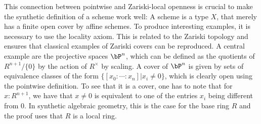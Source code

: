 This connection between pointwise and Zariski-local openness is crucial to make the synthetic definition of a scheme work well:
A scheme is a type $X$, that merely has a finite open cover by affine schemes.
To produce interesting examples, it is necessary to use the locality axiom.
This is related to the Zariski topology and ensures that classical examples of Zariski covers can be reproduced.
A central example are the projective spaces $\bP^n$, which can be defined as the quotients of $R^{n+1}/\{0\}$ by the action of $R^\times$ by scaling.
A cover of $\bP^n$ is given by sets of equivalence classes of the form $\{[x_0:\cdots:x_n] \vert x_i\neq 0 \}$, which is clearly open using the pointwise definition.
To see that it is a cover, one has to note that for $x:R^{n+1}$, we have that $x\neq 0$ is equivalent to one of the entries $x_i$ being different from $0$. In synthetic algebraic geometry, this is the case for the base ring $R$ and the proof uses that $R$ is a local ring.
